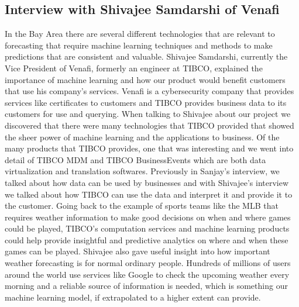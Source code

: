 \documentclass[10pt]{article}
\begin{document}
\subsection*{Interview with Shivajee Samdarshi of Venafi}
In the Bay Area there are several different technologies that are relevant to forecasting that require machine learning techniques and methods to make predictions that are consistent and valuable. Shivajee Samdarshi, currently the Vice President of Venafi, formerly an engineer at TIBCO, explained the importance of machine learning and how our product would benefit customers that use his company's services. Venafi is a cybersecurity company that provides services like certificates to customers and TIBCO provides business data to its customers for use and querying. When talking to Shivajee about our project we discovered that there were many technologies that TIBCO provided that showed the sheer power of machine learning and the applications to business. Of the many products that TIBCO provides, one that was interesting and we went into detail of TIBCO MDM and TIBCO BusinessEvents which are both data virtualization and translation softwares. Previously in Sanjay’s interview, we talked about how data can be used by businesses and with Shivajee’s interview we talked about how TIBCO can use the data and interpret it and provide it to the customer. Going back to the example of sports teams like the MLB that requires weather information to make good decisions on when and where games could be played, TIBCO’s computation services and machine learning products could help provide insightful and predictive analytics on where and when these games can be played. Shivajee also gave useful insight into how important weather forecasting is for normal ordinary people. Hundreds of millions of users around the world use services like Google to check the upcoming weather every morning and a reliable source of information is needed, which is something our machine learning model, if extrapolated to a higher extent can provide.
\end{document}
